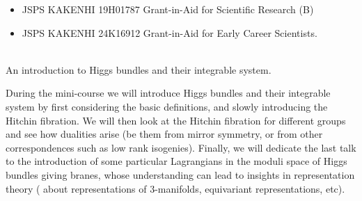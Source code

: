 \documentclass[dvipdfmx,a4paper,12pt]{article}
\theoremstyle{plain} %
\theoremstyle{definition} %
\begin{document}


  \vspace{-11pt}
\begin{itemize}
  \setlength{\parskip}{0cm} 
  \setlength{\itemsep}{0cm}
\item JSPS KAKENHI 19H01787 Grant-in-Aid for Scientific Research (B)
\item JSPS KAKENHI 24K16912 Grant-in-Aid for Early Career Scientists.  
\end{itemize}









\newpage

\vskip5mm


\\
An introduction to Higgs bundles and their integrable system.

\vskip1mm
During the mini-course we will introduce Higgs bundles and
their integrable system by first considering the basic definitions,
and slowly introducing the Hitchin fibration. We will then look at the
Hitchin fibration for different groups and see how dualities arise (be
them from mirror symmetry, or from other correspondences such as low
rank isogenies). Finally, we will dedicate the last talk to the
introduction of some particular Lagrangians in the moduli space of
Higgs bundles giving branes, whose understanding can lead to insights
in representation theory ( about representations of 3-manifolds,
equivariant representations, etc).
\vskip4mm
\end{document}
